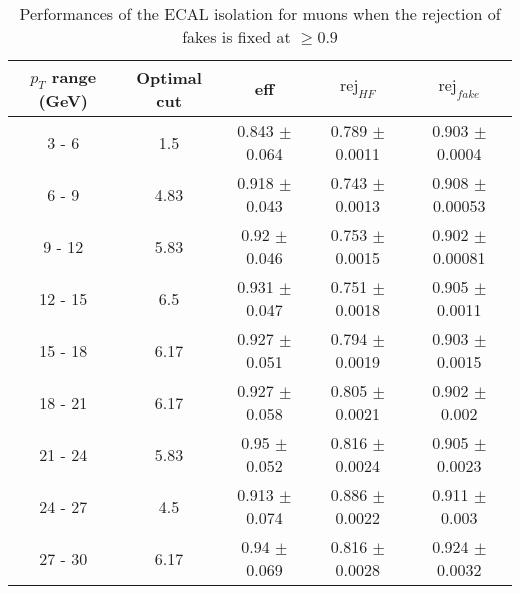 \begin{table}[htbp]
   \centering
   \begin{tabular}{|c|c|c|c|c|}
      \hline
      $p_T$ range (GeV) & Optimal cut & eff & $\textrm{rej}_{HF}$ & $\textrm{rej}_{fake}$ \\
      \hline
      3 - 6 & 1.5 & 0.843 $\pm$ 0.064 & 0.789 $\pm$ 0.0011 & 0.903 $\pm$ 0.0004 \\
      \hline
      6 - 9 & 4.83 & 0.918 $\pm$ 0.043 & 0.743 $\pm$ 0.0013 & 0.908 $\pm$ 0.00053 \\
      \hline
      9 - 12 & 5.83 & 0.92 $\pm$ 0.046 & 0.753 $\pm$ 0.0015 & 0.902 $\pm$ 0.00081 \\
      \hline
      12 - 15 & 6.5 & 0.931 $\pm$ 0.047 & 0.751 $\pm$ 0.0018 & 0.905 $\pm$ 0.0011 \\
      \hline
      15 - 18 & 6.17 & 0.927 $\pm$ 0.051 & 0.794 $\pm$ 0.0019 & 0.903 $\pm$ 0.0015 \\
      \hline
      18 - 21 & 6.17 & 0.927 $\pm$ 0.058 & 0.805 $\pm$ 0.0021 & 0.902 $\pm$ 0.002 \\
      \hline
      21 - 24 & 5.83 & 0.95 $\pm$ 0.052 & 0.816 $\pm$ 0.0024 & 0.905 $\pm$ 0.0023 \\
      \hline
      24 - 27 & 4.5 & 0.913 $\pm$ 0.074 & 0.886 $\pm$ 0.0022 & 0.911 $\pm$ 0.003 \\
      \hline
      27 - 30 & 6.17 & 0.94 $\pm$ 0.069 & 0.816 $\pm$ 0.0028 & 0.924 $\pm$ 0.0032 \\
      \hline
   \end{tabular}
   \caption{\small{Performances of the ECAL isolation for muons when the rejection of fakes is fixed at $\geq 0.9$}\label{tab:ecal_muon_pureFake}}
\end{table}






